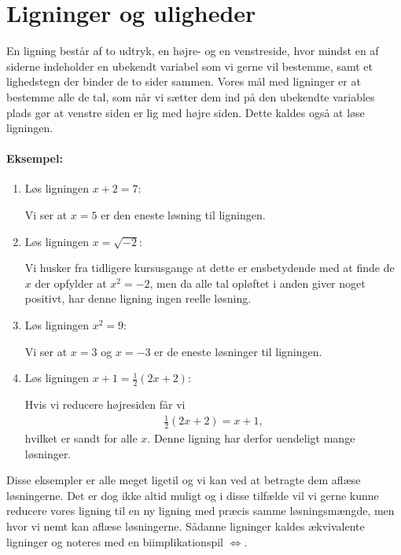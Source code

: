 \section{Ligninger og uligheder}
\noindent En ligning består af to udtryk, en højre- og en venstreside, hvor mindst en af siderne indeholder en ubekendt variabel som vi gerne vil bestemme, samt et lighedstegn der binder de to sider sammen. Vores mål med ligninger er at bestemme alle de tal, som når vi sætter dem ind på den ubekendte variables plads gør at venstre siden er lig med højre siden. Dette kaldes også at løse ligningen.

\paragraph*{Eksempel:}
\begin{enumerate}
\item Løs ligningen $x + 2=7$:

Vi ser at $x=5$ er den eneste løsning til ligningen.
\item Løs ligningen $x=\sqrt{-2}$:

Vi husker fra tidligere kursusgange at dette er ensbetydende med at finde de $x$ der opfylder at $x^2=-2$, men da alle tal opløftet i anden giver noget positivt, har denne ligning ingen reelle løsning.
\item Løs ligningen $x^2 = 9$:

Vi ser at $x=3$ og $x=-3$ er de eneste løsninger til ligningen.

\item Løs ligningen $x+1 = \frac{1}{2}(2x+2)$:

Hvis vi reducere højresiden får vi
\begin{align*}
\frac{1}{2}(2x+2) = x+1,
\end{align*}
hvilket er sandt for alle $x$. Denne ligning har derfor uendeligt mange løsninger.
\end{enumerate}
Disse eksempler er alle meget ligetil og vi kan ved at betragte dem aflæse løsningerne. Det er dog ikke altid muligt og i disse tilfælde vil vi gerne kunne reducere vores ligning til en ny ligning med præcis samme løsningsmængde, men hvor vi nemt kan aflæse løsningerne. Sådanne ligninger kaldes ækvivalente ligninger og noteres med en biimplikationspil $\Leftrightarrow$.


